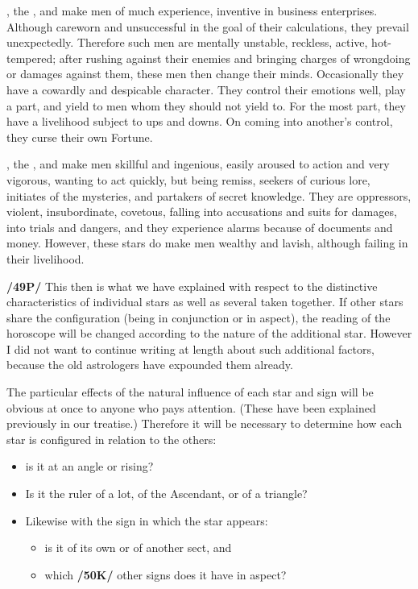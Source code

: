 \Mars, the \Sun, and \Mercury\xspace make men of much experience, inventive in business enterprises. Although careworn and unsuccessful in the goal of their calculations, they prevail unexpectedly. Therefore such men are mentally unstable, reckless, active, hot-tempered; after rushing against their enemies and bringing charges of wrongdoing or damages against them, these men then change their minds.
Occasionally they have a cowardly and despicable character. They control their emotions well, play a part, and yield to men whom they should not yield to. For the most part, they have a livelihood subject to ups and downs. On coming into another’s control, they curse their own Fortune.

\Mars, the \Moon, and \Mercury\xspace make men skillful and ingenious, easily aroused to action and very vigorous, wanting to act quickly, but being remiss, seekers of curious lore, initiates of the mysteries, and partakers of secret knowledge. They are oppressors, violent, insubordinate, covetous, falling into accusations and suits for damages, into trials and dangers, and they experience alarms because of documents
and money. However, these stars do make men wealthy and lavish, although failing in their livelihood. 

\textbf{/49P/} This then is what we have explained with respect to the distinctive characteristics of individual stars as well as several taken together. If other stars share the configuration (being in conjunction or in aspect), the reading of the horoscope will be changed according to the nature of the additional star. However I did not want to continue writing at length about such additional factors, because the old astrologers have expounded them already. 

\mndl[0.2cm]
The particular effects of the natural influence of each star and sign will be obvious at once to anyone who pays attention. (These have been explained previously in our treatise.) Therefore it will be necessary to determine how each star is configured in relation to the others: 
\begin{itemize}
\item is it at an angle or rising? 
\item Is it the ruler of a lot, of the Ascendant, or of a triangle? 
\item Likewise with the sign in which the star appears: 
\begin{itemize}
\item is it of its own or of another sect, and 
\item which \textbf{/50K/} other signs does it have in aspect? 
\end{itemize}
\end{itemize}

